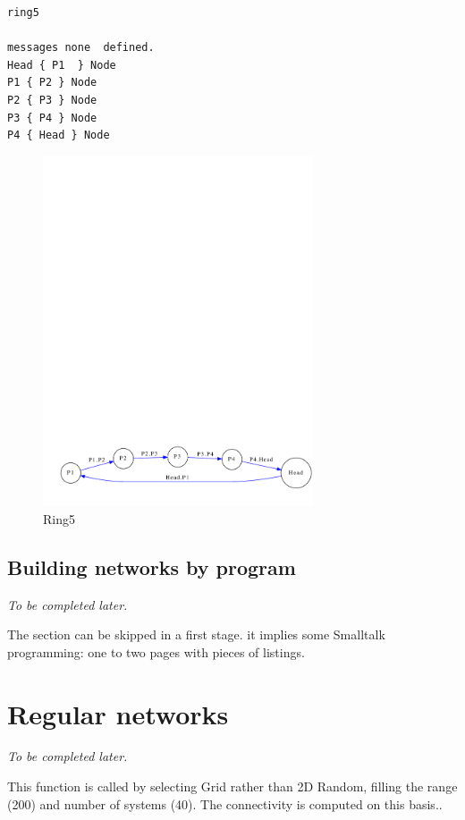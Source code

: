 \documentclass[times]{book}
\begin{document}
\begin{lstlisting} 
ring5

messages none  defined. 
Head { P1  } Node 
P1 { P2 } Node  
P2 { P3 } Node  
P3 { P4 } Node  
P4 { Head } Node 
\end{lstlisting}

\begin{figure}[hbtp]
\begin{center} 
\includegraphics[width=8cm]{ring5-rogne.pdf}
\caption{Ring5}
\label{fig:ring5}
\end{center}
\end{figure}

\subsection{Building networks by program}

{\sl To be completed later.}

The section can be skipped in a first stage. it implies some Smalltalk programming: one to two pages
with pieces of listings.

\section {Regular networks}

{\sl To be completed later.}

 This function is called by selecting Grid rather than 2D Random, filling the range (200) and
number of systems (40). The connectivity is computed on this basis..
\end{document}
